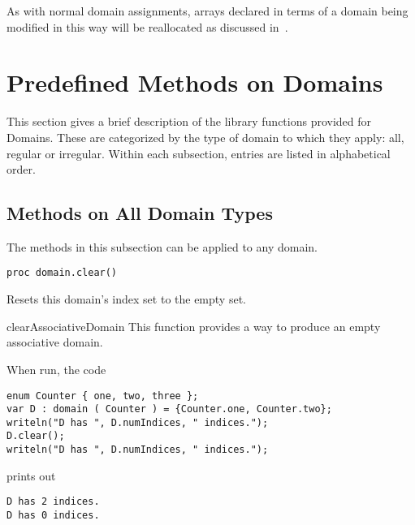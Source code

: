 As with normal domain assignments, arrays declared in terms of a
domain being modified in this way will be reallocated as discussed
in~.



\section{Predefined Methods on Domains}

This section gives a brief description of the library functions provided for
Domains.  These are categorized by the type of domain to which they apply: all,
regular or irregular.  Within each subsection, entries are listed in
alphabetical order.

\subsection{Methods on All Domain Types}

The methods in this subsection can be applied to any domain.

\begin{protohead}
\begin{verbatim}
proc domain.clear()
\end{verbatim}
\end{protohead}
\begin{protobody}
Resets this domain's index set to the empty set.
\end{protobody}

\begin{chapelexample}{clearAssociativeDomain}
This function provides a way to produce an empty associative domain.

When run, the code
\begin{chapel}
\begin{verbatim}
enum Counter { one, two, three };
var D : domain ( Counter ) = {Counter.one, Counter.two};
writeln("D has ", D.numIndices, " indices.");
D.clear();
writeln("D has ", D.numIndices, " indices.");
\end{verbatim}
\end{chapel}
prints out
\begin{chapelprintoutput}
\begin{verbatim}
D has 2 indices.
D has 0 indices.
\end{verbatim}
\end{chapelprintoutput}
\end{chapelexample}

